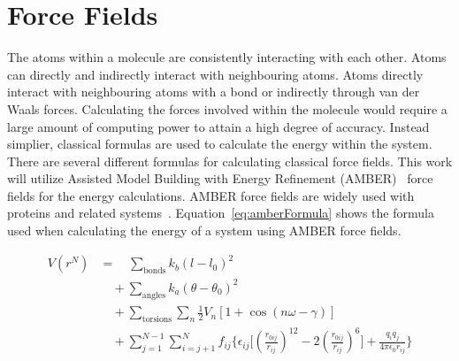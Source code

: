 \section{Force Fields}

The atoms within a molecule are consistently interacting with each other. Atoms can directly and indirectly interact with neighbouring atoms. Atoms directly interact with neighbouring atoms with a bond or indirectly through van der Waals forces. Calculating the forces involved within the molecule would require a large amount of computing power to attain a high degree of accuracy. Instead simplier, classical formulas are used to calculate the energy within the system. There are several different formulas for calculating classical force fields. This work will utilize Assisted Model Building with Energy Refinement (AMBER)~\cite{cornell1995second} force fields for the energy calculations. AMBER force fields are widely used with proteins and related systems~\cite{ponder2003force}. Equation~\ref{eq:amberFormula} shows the formula used when calculating the energy of a system using AMBER force fields.

\begin{equation}
	\begin{split}
		\label{eq:amberFormula}
		V(r^N) &= \quad \sum_\text{bonds} k_b (l-l_0)^2 \\
		&\quad + \sum_\text{angles} k_a (\theta - \theta_0)^2 \\
		&\quad + \sum_\text{torsions} \sum_n \frac{1}{2} V_n [1+\cos(n \omega- \gamma)] \\
		&\quad + \sum_{j=1} ^{N-1} \sum_{i=j+1} ^N f_{ij}\biggl\{\epsilon_{ij}\biggl[\left(\frac{r_{0ij}}{r_{ij}} \right)^{12} - 2\left(\frac{r_{0ij}}{r_{ij}} \right)^{6} \biggr]+ \frac{q_iq_j}{4\pi \epsilon_0 r_{ij}}\biggr\}
	\end{split}
\end{equation}